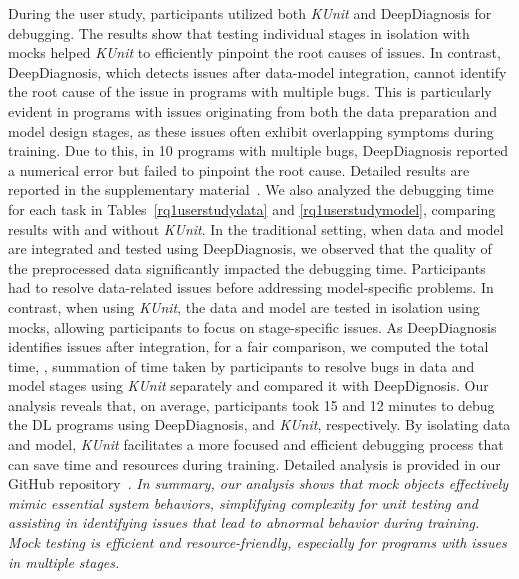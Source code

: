 During the user study, participants utilized both {\em KUnit} and DeepDiagnosis for debugging. The results show that testing individual stages in isolation with mocks helped {\em KUnit} to efficiently pinpoint the root causes of issues.
In contrast, DeepDiagnosis, which detects issues after data-model integration, cannot identify the root cause of the issue in programs with multiple bugs. This is particularly evident in programs with issues originating from both the data preparation and model design stages, as these issues often exhibit overlapping symptoms during training.
Due to this, in 10 programs with multiple bugs, DeepDiagnosis reported a numerical error but failed to pinpoint the root cause. Detailed results are reported in the supplementary material~\cite{rq2results,rq2userstudyresults}.
We also analyzed the debugging time for each task in Tables~\ref{rq1userstudydata} and \ref{rq1userstudymodel}, comparing results with and without {\em KUnit}. In the traditional setting, when data and model are integrated and tested using DeepDiagnosis, we observed that the quality of the preprocessed data significantly impacted the debugging time. Participants had to resolve data-related issues before addressing model-specific problems. 
In contrast, when using {\em KUnit}, the data and model are tested in isolation using mocks, allowing participants to focus on stage-specific issues. As DeepDiagnosis identifies issues after integration, for a fair comparison, we computed the total time, \ie, summation of time taken by participants to resolve bugs in data and model stages using {\em KUnit} separately and compared it with DeepDignosis. 
Our analysis reveals that, on average, participants took 15 and 12 minutes to debug the DL programs using DeepDiagnosis, and {\em KUnit}, respectively. By isolating data and model, {\em KUnit} facilitates a more focused and efficient debugging process that can save time and resources during training. Detailed analysis is provided in our GitHub repository~\cite{debuggingtime}.
\textit{In summary, our analysis shows that mock objects effectively mimic essential system behaviors, simplifying complexity for unit testing and assisting in identifying issues that lead to abnormal behavior during training.
Mock testing is efficient and resource-friendly, especially for programs with issues in multiple stages.}



